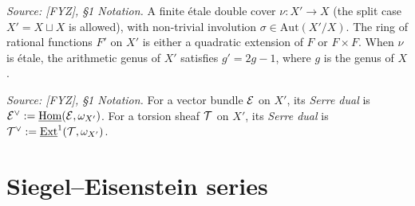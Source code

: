 \begin{definition}
  \label{def:etale-cover}
  \textit{Source: [FYZ], \S1 Notation.}
  A finite étale double cover \(\nu : X' \to X\) (the split case \(X' = X \sqcup X\)
  is allowed), with non-trivial involution \(\sigma \in \mathrm{Aut}(X'/X)\). The ring
  of rational functions \(F'\) on \(X'\) is either a quadratic extension of \(F\) or
  \(F \times F\). When \(\nu\) is étale, the arithmetic genus of \(X'\) satisfies
  \(g' = 2g - 1\), where \(g\) is the genus of \(X\).
\end{definition}

\begin{definition}
  \label{def:serre-dual-vb}
  \textit{Source: [FYZ], \S1 Notation.}
  For a vector bundle \(\mathcal{E}\) on \(X'\), its \emph{Serre dual} is
  \(\mathcal{E}^\vee := \underline{\mathrm{Hom}}(\mathcal{E}, \omega_{X'})\). For a torsion sheaf
  \(\mathcal{T}\) on \(X'\), its \emph{Serre dual} is
  \(\mathcal{T}^\vee := \underline{\mathrm{Ext}}^1(\mathcal{T}, \omega_{X'})\).
\end{definition}

\section{Siegel--Eisenstein series}

